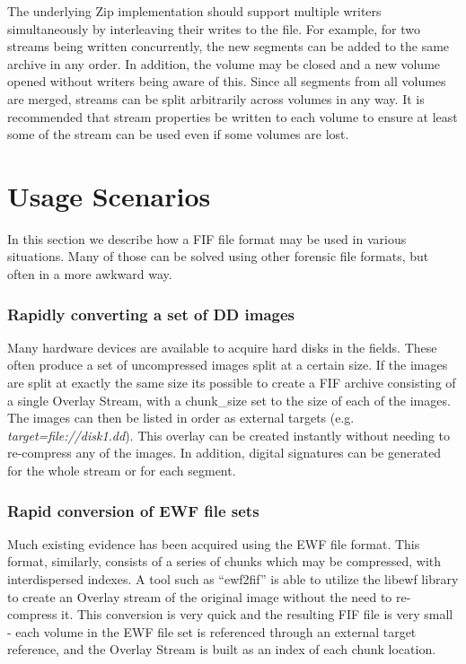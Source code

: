 \documentclass[10pt, conference]{IEEEtran}
\begin{document}
The underlying Zip implementation should support multiple writers
simultaneously by interleaving their writes to the file. For example,
for two streams being written concurrently, the new segments can be
added to the same archive in any order. In addition, the volume may be
closed and a new volume opened without writers being aware of
this. Since all segments from all volumes are merged, streams can be
split arbitrarily across volumes in any way. It is recommended that
stream properties be written to each volume to ensure at least some of
the stream can be used even if some volumes are lost.

\section{Usage Scenarios}
In this section we describe how a FIF file format may be used in
various situations. Many of those can be solved using other forensic
file formats, but often in a more awkward way.

\subsubsection{Rapidly converting a set of DD images}
Many hardware devices are available to acquire hard disks in the
fields. These often produce a set of uncompressed images split at a
certain size. If the images are split at exactly the same size its
possible to create a FIF archive consisting of a single Overlay
Stream, with a chunk\_size set to the size of each of the images. The
images can then be listed in order as external targets (e.g. {\em
target=file://disk1.dd}). This overlay can be created instantly
without needing to re-compress any of the images. In addition, digital
signatures can be generated for the whole stream or for each segment.

\subsubsection{Rapid conversion of EWF file sets}
Much existing evidence has been acquired using the EWF file
format. This format, similarly, consists of a series of chunks which
may be compressed, with interdispersed indexes. A tool such as
``ewf2fif'' is able to utilize the libewf library to create an Overlay
stream of the original image without the need to re-compress it. This
conversion is very quick and the resulting FIF file is very small -
each volume in the EWF file set is referenced through an external
target reference, and the Overlay Stream is built as an index of each
chunk location.
\end{document}

